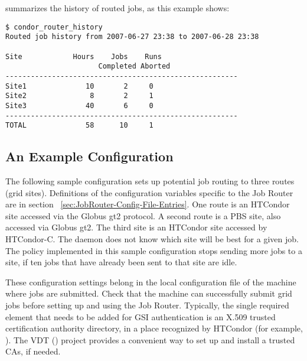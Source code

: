  summarizes the history of routed jobs,
as this example shows:

\begin{verbatim}
$ condor_router_history
Routed job history from 2007-06-27 23:38 to 2007-06-28 23:38

Site            Hours    Jobs    Runs
                      Completed Aborted
-------------------------------------------------------
Site1              10       2     0
Site2               8       2     1
Site3              40       6     0
-------------------------------------------------------
TOTAL              58      10     1
\end{verbatim}


\subsection{\label{ExampleJobRouterConfiguration} An Example Configuration}

The following sample configuration sets up potential job routing
to three routes (grid sites).
Definitions of the configuration variables specific to the Job Router
are in section~ \ref{sec:JobRouter-Config-File-Entries}.
One route is an HTCondor site accessed via the Globus gt2 protocol.
A second route is a PBS site, also accessed via Globus gt2.
The third site is an HTCondor site accessed by HTCondor-C.
The  daemon
does not know which site will be best for a given job.
The policy implemented in this sample configuration 
stops sending more jobs to a site,
if ten jobs that have already been sent to that site are idle.

These configuration settings belong in the local configuration file
of the machine where jobs are submitted.
Check that the machine can successfully submit grid jobs
before setting up and using the Job Router.
Typically, the single required element that needs to be
added for GSI authentication
is an X.509 trusted certification authority directory,
in a place recognized by HTCondor
(for example,  ).
The VDT () project provides 
a convenient way to set up and install a trusted CAs,
if needed.

